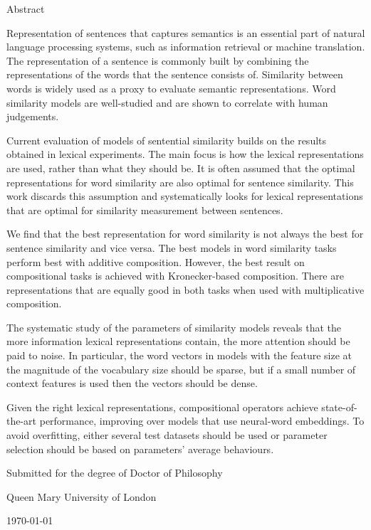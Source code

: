 {\Large \headingfont \thetitle}

\vspace{1em}

{\large \headingfont \theauthor}

\vspace{1em}

{\headingfont Abstract}

Representation of sentences that captures semantics is an essential part of natural language processing systems, such as information retrieval or machine translation. The representation of a sentence is commonly built by combining the representations of the words that the sentence consists of. Similarity between words is widely used as a proxy to evaluate semantic representations. Word similarity models are well-studied and are shown to correlate with human judgements.
% 
% 

Current evaluation of models of sentential similarity builds on the results obtained in lexical experiments. The main focus is how the lexical representations are used, rather than what they should be. It is often assumed that the optimal representations for word similarity are also optimal for sentence similarity. This work discards this assumption and systematically looks for lexical representations that are optimal for similarity measurement between sentences.

We find that the best representation for word similarity is not always the best for sentence similarity and vice versa. The best models in word similarity tasks perform best with additive composition. However, the best result on compositional tasks is achieved with Kronecker-based composition. There are representations that are equally good in both tasks when used with multiplicative composition.

The systematic study of the parameters of similarity models reveals that the more information lexical representations contain, the more attention should be paid to noise. In particular, the word vectors in models with the feature size at the magnitude of the vocabulary size should be sparse, but if a small number of context features is used then the vectors should be dense.

Given the right lexical representations, compositional operators achieve state-of-the-art performance, improving over models that use neural-word embeddings. To avoid overfitting, either several test datasets should be used or parameter selection should be based on parameters' average behaviours.

\vfill


Submitted for the degree of Doctor of Philosophy

Queen Mary University of London

\today


